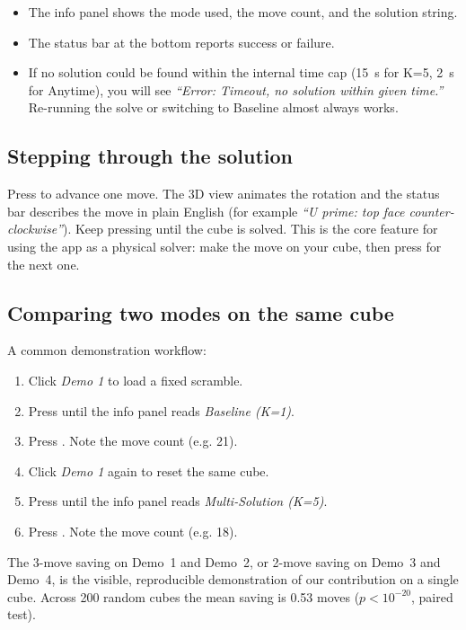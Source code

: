 \documentclass[11pt,a4paper]{article}
\newcommand{\key}[1]{\fbox{\texttt{\strut#1}}}
\begin{document}
\begin{itemize}[leftmargin=2em]
  \item The info panel shows the mode used, the move count, and the
        solution string.
  \item The status bar at the bottom reports success or failure.
  \item If no solution could be found within the internal time cap
        (15~s for K=5, 2~s for Anytime), you will see
        \textit{``Error: Timeout, no solution within given time.''}
        Re-running the solve or switching to Baseline almost always works.
\end{itemize}

\subsection{Stepping through the solution}

Press \key{N} to advance one move. The 3D view animates the rotation and
the status bar describes the move in plain English (for example
\textit{``U prime: top face counter-clockwise''}). Keep pressing \key{N}
until the cube is solved. This is the core feature for using the app as
a physical solver: make the move on your cube, then press \key{N} for
the next one.

\subsection{Comparing two modes on the same cube}

A common demonstration workflow:

\begin{enumerate}[leftmargin=2em]
  \item Click \textit{Demo 1} to load a fixed scramble.
  \item Press \key{M} until the info panel reads \textit{Baseline (K=1)}.
  \item Press \key{Enter}. Note the move count (e.g. 21).
  \item Click \textit{Demo 1} again to reset the same cube.
  \item Press \key{M} until the info panel reads \textit{Multi-Solution (K=5)}.
  \item Press \key{Enter}. Note the move count (e.g. 18).
\end{enumerate}

The 3-move saving on Demo~1 and Demo~2, or 2-move saving on Demo~3 and
Demo~4, is the visible, reproducible demonstration of our contribution
on a single cube. Across 200 random cubes the mean saving is 0.53
moves ($p < 10^{-20}$, paired test).
\end{document}
